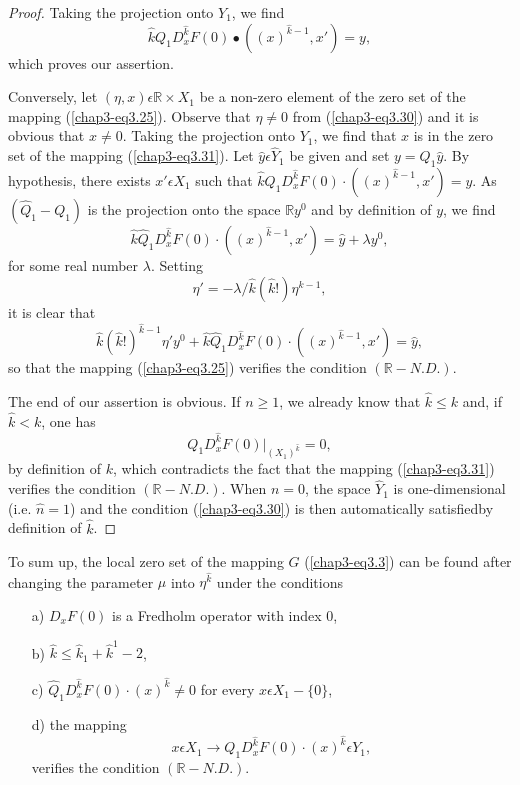 \begin{proof}
Taking the projection onto $Y_{1}$, we find
$$
\hat{k}Q_{1} D_{x}^{\hat{k}}F(0) \bullet ((x)^{\hat{k}-1}, x') = y,
$$\pageoriginale
which proves our assertion.

Conversely, let $(\eta, x) \epsilon \mathbb{R} \times X_{1}$ be a
non-zero element of the zero set of the mapping
(\ref{chap3-eq3.25}). Observe that $\eta \neq 0$ from
(\ref{chap3-eq3.30}) and it is obvious that $x \neq 0$. Taking the
projection onto $Y_{1}$, we find that $x$ is in the zero set of the
mapping (\ref{chap3-eq3.31}). Let $\hat{y} \epsilon \hat{Y}_{1}$ be
given and set $y = Q_{1}\hat{y}$. By hypothesis, there exists $x'
\epsilon X_{1}$ such that $\hat{k}Q_{1} D_{x}^{\hat{k}}F(0) \cdot
((x)^{\hat{k}-1}, x') = y$. As $(\hat{Q}_{1} - Q_{1})$ is the
projection onto the space $\mathbb{R}y^{0}$ and by definition of $y$, we
find
$$
\hat{k} \hat{Q}_{1} D_{x}^{\hat{k}}F(0) \cdot ((x)^{\hat{k} - 1}, x')
= \hat{y} + \lambda y^{0},
$$
for some real number $\lambda$. Setting
$$
\eta' = -\lambda / \hat{k} (\hat{k}!) \eta^{\hat{k}-1},
$$
it is clear that
$$
\hat{k}(\hat{k}!)^{\hat{k}-1} \eta'y^{0} + \hat{k}\hat{Q}_{1}
D_{x}^{\hat{k}}F(0) \cdot ((x)^{\hat{k}-1}, x') = \hat{y},
$$
so that the mapping (\ref{chap3-eq3.25}) verifies the condition
$(\mathbb{R}-N.D.).$

The end of our assertion is obvious. If $n \geq 1$, we already know
that $\hat{k} \leq k$ and, if $\hat{k} < k$, one has
$$
Q_{1} D_{x}^{\hat{k}}F(0) |_{(X_{1})^{\hat{k}}} = 0,
$$
by definition of $k$, which contradicts the fact that the mapping
(\ref{chap3-eq3.31}) verifies the condition $(\mathbb{R}-N.D.)$. When
$n = 0$, the space $\hat{Y}_{1}$ is one-dimensional (i.e. $\hat{n} =
1$) and the condition (\ref{chap3-eq3.30}) is then automatically
satisfied\pageoriginale by definition of $\hat{k}$.
\end{proof}

To sum up, the local zero set of the mapping $G$ (\ref{chap3-eq3.3}) can
be found after changing the parameter $\mu$ into $\eta^{\hat{k}}$
under the conditions 
\begin{enumerate}
\item[a)] $D_{x}F(0)$ is a Fredholm operator with index 0,

\item[b)] $\hat{k} \leq \hat{k}_{1} + \hat{k}^{1} - 2$,

\item[c)] $\hat{Q}_{1} D_{x}^{\hat{k}}F(0) \cdot (x)^{\hat{k}} \neq 0$
  for every $x \epsilon X_{1} - \{0\}$,

\item[d)] the mapping
$$
x \epsilon X_{1} \to Q_{1}D_{x}^{\hat{k}}F(0) \cdot (x)^{\hat{k}}
\epsilon Y_{1},
$$
verifies the condition $(\mathbb{R}-N.D.)$.
\end{enumerate}


